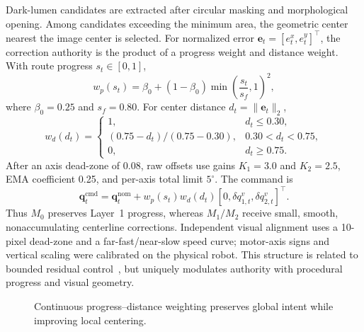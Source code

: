 \documentclass[letterpaper,10pt,conference]{ieeeconf}
\newcommand{\qcmd}{\mathbf{q}^{\mathrm{cmd}}}
\newcommand{\qnom}{\mathbf{q}^{\mathrm{nom}}}
\begin{document}
Dark-lumen candidates are extracted after circular masking and morphological
opening. Among candidates exceeding the minimum area, the geometric center
nearest the image center is selected. For normalized error
$\mathbf e_t=[e^x_t,e^y_t]^\top$, the correction authority is the product of a
progress weight and distance weight. With route progress $s_t\in[0,1]$,
\begin{equation}
 w_p(s_t)=\beta_0+(1-\beta_0)
 \min\!\left(\frac{s_t}{s_f},1\right)^2,
\end{equation}
where $\beta_0=0.25$ and $s_f=0.80$. For center distance
$d_t=\|\mathbf e_t\|_2$,
\begin{equation}
 w_d(d_t)=\begin{cases}
 1,&d_t\le0.30,\\
 (0.75-d_t)/(0.75-0.30),&0.30<d_t<0.75,\\
 0,&d_t\ge0.75.
 \end{cases}
\end{equation}
After an axis dead-zone of 0.08, raw offsets use gains
$K_1=3.0$ and $K_2=2.5$, EMA coefficient 0.25, and per-axis total limit
$5^\circ$. The command is
\begin{equation}
 \qcmd_t=\qnom_t+
 w_p(s_t)w_d(d_t)[0,\delta q^v_{1,t},\delta q^v_{2,t}]^\top.
\end{equation}
Thus $M_0$ preserves Layer~1 progress, whereas $M_1/M_2$ receive small,
smooth, nonaccumulating centerline corrections. Independent visual alignment
uses a 10-pixel dead-zone and a far-fast/near-slow speed curve; motor-axis signs
and vertical scaling were calibrated on the physical robot. This structure is
related to bounded residual control~\cite{johannink2019residual}, but uniquely
modulates authority with procedural progress and visual geometry.

\begin{figure}[t]
\centering
{}
\caption{Continuous progress--distance weighting preserves global intent while improving local centering.}
\label{fig:layer2}
\end{figure}
\end{document}
